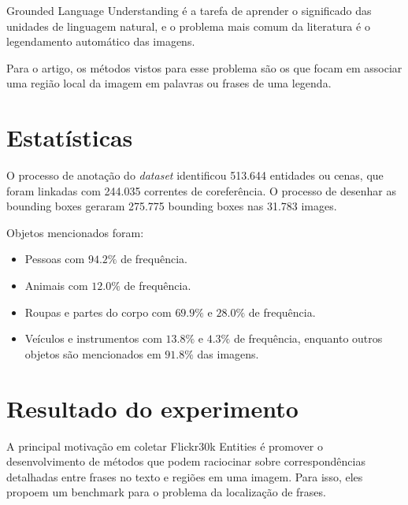 \documentclass[12pt]{article}
\begin{document}
Grounded Language Understanding é a tarefa de aprender o significado das unidades de linguagem natural, e o problema mais comum da literatura é o legendamento automático das imagens.

Para o artigo, os métodos vistos para esse problema são os que focam em associar uma região local da imagem em palavras ou frases de uma legenda.


\section*{Estatísticas}

O processo de anotação do \textit{dataset} identificou 513.644 entidades ou cenas, que foram linkadas com 244.035 correntes de coreferência. O processo de desenhar as bounding boxes geraram 275.775 bounding boxes nas 31.783 images.

Objetos mencionados foram:

\begin{itemize}
\item Pessoas com $94.2\%$ de frequência.
\item Animais com $12.0\%$ de frequência.
\item Roupas e partes do corpo com $69.9\%$ e $28.0\%$ de frequência.
\item Veículos e instrumentos com $13.8\%$ e $4.3\%$ de frequência, enquanto outros objetos são mencionados em $91.8\%$ das imagens.
\end{itemize}

\section*{Resultado do experimento}

A principal motivação em coletar Flickr30k Entities é promover o desenvolvimento de métodos que podem raciocinar sobre correspondências detalhadas entre frases no texto e regiões em uma imagem. Para isso, eles propoem um benchmark para o problema da localização de frases.
\end{document}
